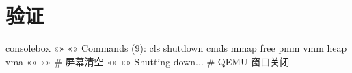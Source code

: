 \section{验证}

\begin{tcblisting}{consolebox}
«» «»
Commands (9):
cls       shutdown  cmds      mmap      free
pmm       vmm       heap      vma
«» «»
# 屏幕清空
«» «»
Shutting down...
# QEMU 窗口关闭
\end{tcblisting}


